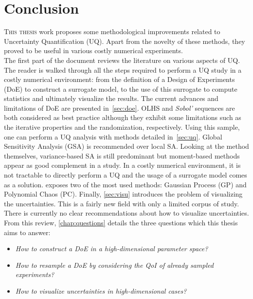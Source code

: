\chapter*{Conclusion}

\lettrine{T}{his thesis} work proposes some methodological improvements related to Uncertainty Quantification (UQ). Apart from the novelty of these methods, they proved to be useful in various costly numerical experiments.\\

The first part of the document reviews the literature on various aspects of UQ. The reader is walked through all the steps required to perform a UQ study in a costly numerical environment: from the definition of a Design of Experiments (DoE) to construct a surrogate model, to the use of this surrogate to compute statistics and ultimately visualize the results. The current advances and limitations of DoE are presented in~\cref{sec:doe}. OLHS and \emph{Sobol'} sequences are both considered as best practice although they exhibit some limitations such as the iterative properties and the randomization, respectively. Using this sample, one can perform a UQ analysis with methods detailed in~\cref{sec:uq}. Global Sensitivity Analysis (GSA) is recommended over local SA. Looking at the method themselves, variance-based SA is still predominant but moment-based methods appear as good complement in a study. In a costly numerical environment, it is not tractable to directly perform a UQ and the usage of a surrogate model comes as a solution.  exposes two of the most used methods: Gaussian Process (GP) and Polynomial Chaos (PC). Finally, \cref{sec:visu} introduces the problem of visualizing the uncertainties. This is a fairly new field with only a limited corpus of study. There is currently no clear recommendations about how to visualize uncertainties. From this review, \cref{chap:questions} details the three questions which this thesis aims to answer:
\begin{itemize}
\item \emph{How to construct a DoE in a high-dimensional parameter space?}
\item \emph{How to resample a DoE by considering the QoI of already sampled experiments?}
\item \emph{How to visualize uncertainties in high-dimensional cases?}
\end{itemize}

